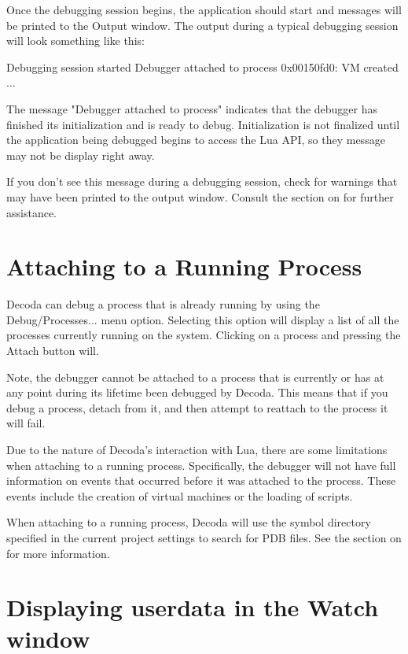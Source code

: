 Once the debugging session begins, the application should start and messages will be printed to
the Output window. The output during a typical debugging session will look something like this:

{\verbatim Debugging session started
Debugger attached to process
0x00150fd0: VM created
... }

The message "Debugger attached to process" indicates that the debugger has finished its
initialization and is ready to debug. Initialization is not finalized until the application being
debugged begins to access the Lua API, so they message may not be display right away.

If you don't see this message during a debugging session, check for warnings that may have been
printed to the output window.  Consult the section on  for further
assistance.

\section{Attaching to a Running Process}\label{attaching_debugger}

Decoda can debug a process that is already running by using the Debug/Processes... menu option.
Selecting this option will display a list of all the processes currently running on the system.
Clicking on a process and pressing the Attach button will.

Note, the debugger cannot be attached to a process that is currently or has at any point during
its lifetime been debugged by Decoda. This means that if you debug a process, detach from it, and
then attempt to reattach to the process it will fail.

Due to the nature of Decoda's interaction with Lua, there are some limitations when attaching to a
running process.  Specifically, the debugger will not have full information on events that occurred
before it was attached to the process.  These events include the creation of virtual machines or
the loading of scripts.

When attaching to a running process, Decoda will use the symbol directory specified in the current
project settings to search for PDB files. See the section on 
for more information.

\section{Displaying userdata in the Watch window}\label{watch}

